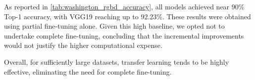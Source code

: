 As reported in \autoref{tab:washington_rgbd_accuracy}, all models achieved near 90\% Top-1 accuracy, with VGG19 reaching up to 92.23\%. These results were obtained using partial fine-tuning alone. Given this high baseline, we opted not to undertake complete fine-tuning, concluding that the incremental improvements would not justify the higher computational expense. 

Overall, for sufficiently large datasets, transfer learning tends to be highly effective, eliminating the need for complete fine-tuning.
